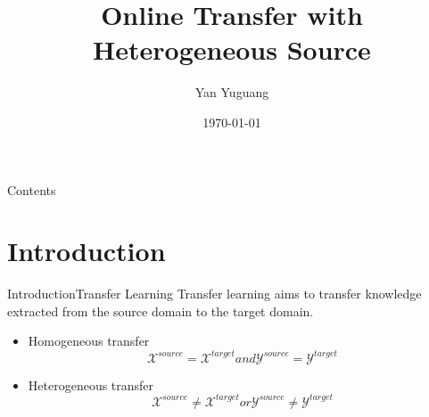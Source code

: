 \documentclass{beamer}
\begin{document}
\title[OHT]{Online Transfer with Heterogeneous Source}
\author[yanyg]{Yan Yuguang}
\date{\today}
\subject{Online Heterogeneous Transfer}


\maketitle

\begin{frame}{Contents}
  \tableofcontents[hideallsubsections]
\end{frame}

\section{Introduction}
\begin{frame}{Introduction}{Transfer Learning}
Transfer learning aims to transfer knowledge extracted from the source domain to the target domain.
\begin{itemize}
\item
Homogeneous transfer
$$ \mathcal{X}^{source} = \mathcal{X}^{target} and \mathcal{Y}^{source} = \mathcal{Y}^{target} $$
\item
Heterogeneous transfer
$$ \mathcal{X}^{source} \neq \mathcal{X}^{target} or \mathcal{Y}^{source} \neq \mathcal{Y}^{target} $$
\end{itemize}
\end{frame}
\end{document}
